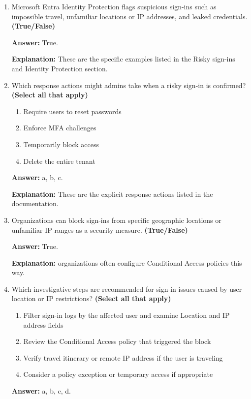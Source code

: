 \documentclass[10pt]{article}
\begin{document}
\begin{enumerate}[leftmargin=*]
\textbf{Explanation:} this exact example and resolution path.

\item Microsoft Entra Identity Protection flags suspicious sign-ins such as impossible travel, unfamiliar locations or IP addresses, and leaked credentials. \textbf{(True/False)}

\textbf{Answer:} True.

\textbf{Explanation:} These are the specific examples listed in the Risky sign-ins and Identity Protection section.

\item Which response actions might admins take when a risky sign-in is confirmed? \textbf{(Select all that apply)}
\begin{enumerate}[label=\alph*., leftmargin=1.5em]
\item Require users to reset passwords
\item Enforce MFA challenges
\item Temporarily block access
\item Delete the entire tenant
\end{enumerate}
\textbf{Answer:} a, b, c.

\textbf{Explanation:} These are the explicit response actions listed in the documentation.

\item Organizations can block sign-ins from specific geographic locations or unfamiliar IP ranges as a security measure. \textbf{(True/False)}

\textbf{Answer:} True.

\textbf{Explanation:} organizations often configure Conditional Access policies this way.

\item Which investigative steps are recommended for sign-in issues caused by user location or IP restrictions? \textbf{(Select all that apply)}
\begin{enumerate}[label=\alph*., leftmargin=1.5em]
\item Filter sign-in logs by the affected user and examine Location and IP address fields
\item Review the Conditional Access policy that triggered the block
\item Verify travel itinerary or remote IP address if the user is traveling
\item Consider a policy exception or temporary access if appropriate
\end{enumerate}
\textbf{Answer:} a, b, c, d.


\end{enumerate}
\end{document}

